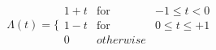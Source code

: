 \documentclass[preview]{standalone}
\begin{document}
\begin{align*}
\Lambda(t)=\big\{\begin{array}{rcl}1+t & \textrm{for} & -1\leq t<0 \\ 1-t & \textrm{for} & 0\leq t \leq +1 \\ 0 & otherwise \end{array}
\end{align*}
\end{document}
